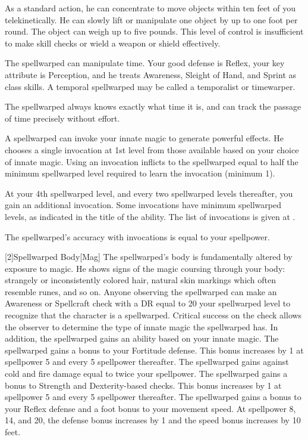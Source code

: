         As a standard action, he can concentrate to move objects within ten feet of you telekinetically.
        He can slowly lift or manipulate one object by up to one foot per round.
        The object can weigh up to five pounds.
        This level of control is insufficient to make skill checks or wield a weapon or shield effectively.

        The spellwarped can manipulate time.
        Your good defense is Reflex, your key attribute is Perception, and he treats Awareness, Sleight of Hand, and Sprint as class skills.
        A temporal spellwarped may be called a temporalist or timewarper.

        The spellwarped always knows exactly what time it is, and can track the passage of time precisely without effort.

        A spellwarped can invoke your innate magic to generate powerful effects.
        He chooses a single invocation at 1st level from those available based on your choice of innate magic.
        Using an invocation inflicts  to the spellwarped equal to half the minimum spellwarped level required to learn the invocation (minimum 1).

        At your 4th spellwarped level, and every two spellwarped levels thereafter, you gain an additional invocation.
        Some invocations have minimum spellwarped levels, as indicated in the title of the ability.
        The list of invocations is given at .

        The spellwarped's accuracy with invocations is equal to your spellpower.

        [2]{Spellwarped Body}[Mag]
        The spellwarped's body is fundamentally altered by exposure to magic.
        He shows signs of the magic coursing through your body: strangely or inconsistently colored hair, natural skin markings which often resemble runes, and so on.
        Anyone observing the spellwarped can make an Awareness or Spellcraft check with a DR equal to 20 \sub your spellwarped level to recognize that the character is a spellwarped.
        Critical success on the check allows the observer to determine the type of innate magic the spellwarped has.
        In addition, the spellwarped gains an ability based on your innate magic.
        The spellwarped gains a  bonus to your Fortitude defense.
        This bonus increases by 1 at spellpower 5 and every 5 spellpower thereafter.
        The spellwarped gains  against cold and fire damage equal to twice your spellpower.
        The spellwarped gains a  bonus to Strength and Dexterity-based checks.
        This bonus increases by 1 at spellpower 5 and every 5 spellpower thereafter.
        The spellwarped gains a  bonus to your Reflex defense and a  foot bonus to your movement speed.
        At spellpower 8, 14, and 20, the defense bonus increases by 1 and the speed bonus increases by 10 feet.

